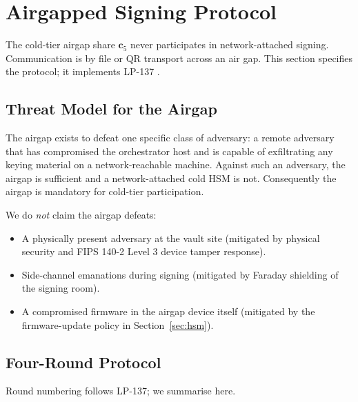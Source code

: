 \section{Airgapped Signing Protocol}

\label{sec:airgap}

The cold-tier airgap share $\mathbf{c}_5$ never participates in
network-attached signing. Communication is by file or QR transport
across an air gap. This section specifies the protocol; it
implements LP-137 \cite{lp137}.

\subsection{Threat Model for the Airgap}

The airgap exists to defeat one specific class of adversary: a
remote adversary that has compromised the orchestrator host and is
capable of exfiltrating any keying material on a network-reachable
machine. Against such an adversary, the airgap is sufficient and a
network-attached cold HSM is not. Consequently the airgap is
mandatory for cold-tier participation.

We do \emph{not} claim the airgap defeats:

\begin{itemize}[nosep]
\item A physically present adversary at the vault site (mitigated by
physical security and FIPS 140-2 Level 3 device tamper response).
\item Side-channel emanations during signing (mitigated by Faraday
shielding of the signing room).
\item A compromised firmware in the airgap device itself (mitigated
by the firmware-update policy in Section~\ref{sec:hsm}).
\end{itemize}

\subsection{Four-Round Protocol}

Round numbering follows LP-137; we summarise here.


